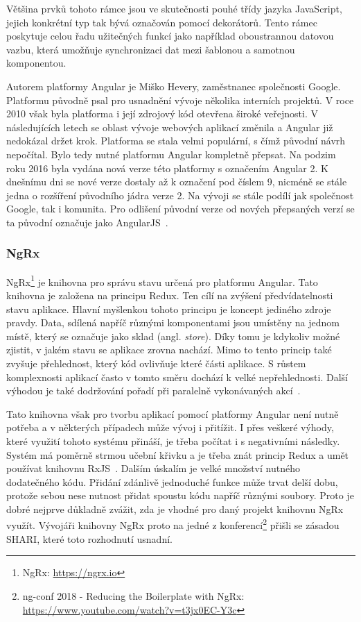 Většina prvků tohoto rámce jsou ve skutečnosti pouhé třídy jazyka JavaScript, jejich konkrétní typ tak bývá označován pomocí dekorátorů.
Tento rámec poskytuje celou řadu užitečných funkcí jako například oboustrannou datovou vazbu, která umožňuje synchronizaci dat mezi šablonou a samotnou komponentou.

Autorem platformy Angular je Miško Hevery, zaměstnanec společnosti Google. Platformu původně psal pro usnadnění vývoje několika interních projektů. V roce 2010 však byla platforma i její zdrojový kód otevřena široké veřejnosti. V následujících letech se oblast vývoje webových aplikací změnila a Angular již nedokázal držet krok. Platforma se stala velmi populární, s čímž původní návrh nepočítal. Bylo tedy nutné platformu Angular kompletně přepsat. Na podzim roku 2016 byla vydána nová verze této platformy s označením Angular 2. K dnešnímu dni se nové verze dostaly až k označení pod číslem 9, nicméně se stále jedna o rozšíření původního jádra verze 2. Na vývoji se stále podílí jak společnost Google, tak i komunita. Pro odlišení původní verze od nových přepsaných verzí se ta původní označuje jako AngularJS~\cite{bib:angular-history}.

\subsubsection{NgRx}\label{sec:ngrx}
NgRx\footnote{NgRx: \url{https://ngrx.io}} je knihovna pro správu stavu určená pro platformu Angular. Tato knihovna je založena na principu Redux. Ten cílí na zvýšení předvídatelnosti stavu aplikace. Hlavní myšlenkou tohoto principu je koncept jediného zdroje pravdy. Data, sdílená napříč různými komponentami jsou umístěny na jednom místě, který se označuje jako sklad (angl. \emph{store}). Díky tomu je kdykoliv možné zjistit, v jakém stavu se aplikace zrovna nachází. Mimo to tento princip také zvyšuje přehlednost, který kód ovlivňuje které části aplikace. S růstem komplexnosti aplikací často v tomto směru dochází k velké nepřehlednosti. Další výhodou je také dodržování pořadí při paralelně vykonávaných akcí~\cite{bib:ngrx-arch}.

Tato knihovna však pro tvorbu aplikací pomocí platformy Angular není nutně potřeba a v některých případech může vývoj i přitížit. I přes veškeré výhody, které využití tohoto systému přináší, je třeba počítat i s negativními následky. Systém má poměrně strmou učební křivku a je třeba znát princip Redux a umět používat knihovnu RxJS~\cite{bib:ngrx-docs}.
Dalším úskalím je velké množství nutného dodatečného kódu. Přidání zdánlivě jednoduché funkce může trvat delší dobu, protože sebou nese nutnost přidat spoustu kódu napříč různými soubory. Proto je dobré nejprve důkladně zvážit, zda je vhodné pro daný projekt knihovnu NgRx využít. Vývojáři knihovny NgRx proto na jedné z konferencí\footnote {ng-conf 2018 - Reducing the Boilerplate with NgRx: \url{https://www.youtube.com/watch?v=t3jx0EC-Y3c}} přišli se zásadou SHARI, které toto rozhodnutí usnadní. 

